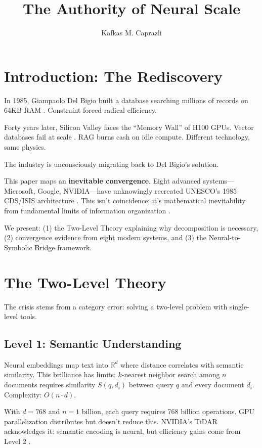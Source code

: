 \documentclass[manuscript,screen,nonacm]{acmart}
\title{The Authority of Neural Scale}
\author{Kafkas M. Caprazli}
\affiliation{%
  \institution{Independent Researcher}
  \city{Wolfsburg}
  \country{Germany}
}
\begin{document}
\maketitle

\section{Introduction: The Rediscovery}

In 1985, Giampaolo Del Bigio built a database searching millions of records on 64KB RAM \cite{delbigio1995}. Constraint forced radical efficiency.

Forty years later, Silicon Valley faces the ``Memory Wall'' of H100 GPUs. Vector databases fail at scale \cite{bruckhaus2024}. RAG burns cash on idle compute. Different technology, same physics.

The industry is unconsciously migrating back to Del Bigio's solution.

This paper maps an \textbf{inevitable convergence}. Eight advanced systems---Microsoft, Google, NVIDIA---have unknowingly recreated UNESCO's 1985 CDS/ISIS architecture \cite{unesco1989}. This isn't coincidence; it's mathematical inevitability from fundamental limits of information organization \cite{weller2025}.

We present: (1) the Two-Level Theory explaining why decomposition is necessary, (2) convergence evidence from eight modern systems, and (3) the Neural-to-Symbolic Bridge framework.

\section{The Two-Level Theory}

The crisis stems from a category error: solving a two-level problem with single-level tools.

\subsection{Level 1: Semantic Understanding}

Neural embeddings map text into $\mathbb{R}^d$ where distance correlates with semantic similarity. This brilliance has limits: $k$-nearest neighbor search among $n$ documents requires similarity $S(q, d_i)$ between query $q$ and every document $d_i$. Complexity: $O(n \cdot d)$.

With $d=768$ and $n=1$ billion, each query requires 768 billion operations. GPU parallelization distributes but doesn't reduce this. NVIDIA's TiDAR acknowledges it: semantic encoding is neural, but efficiency gains come from Level 2 \cite{liu2024}.
\end{document}

